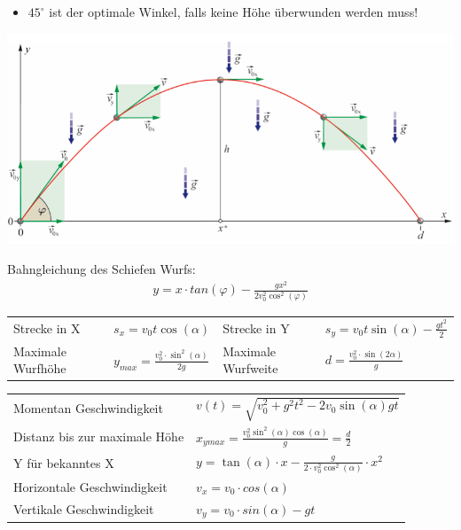 \documentclass[
a4paper,
oneside,
landscape, 
8pt,
]{scrartcl}
\begin{document}
\begin{multicols*}{2}
\begin{itemize}
	\item $45^\circ$ ist der optimale Winkel, falls keine Höhe überwunden werden muss!
\end{itemize}

\begin{minipage}[h!]{0.6\linewidth}
	\includegraphics[width=0.9\linewidth]{images/schiefer_wurf}
\end{minipage}
\hfill
\begin{minipage}[h!]{0.4\linewidth}
Bahngleichung des Schiefen Wurfs: 
\begin{align*}
y = x \cdot tan(\varphi) - \frac{g x^2}{2 v_0^2 \cos^2(\varphi)}
\end{align*}
\end{minipage}

\begin{tabbing}
	\begin{tabu} to \linewidth {X l X l}
		\toprule
		Strecke in X & $s_x = v_0 t \cos(\alpha)$ &
		Strecke in Y & $s_y = v_0 t \sin(\alpha)  - \frac{gt^2}{2}$ \\
		Maximale Wurfhöhe & $y_{max} = \frac{v_0^2 \cdot \sin^2(\alpha)}{2g}$ &
		Maximale Wurfweite & $d = \frac{v_0^2 \cdot \sin(2\alpha)}{g}$ \\
	\end{tabu}
\end{tabbing}

\begin{tabbing}
	\begin{tabu} to \linewidth {l X}
		Momentan Geschwindigkeit & $v(t) = \sqrt{v_0^2 + g^2 t^2 - 2 v_0 \sin(\alpha) gt}$ \\
		Distanz bis zur maximale Höhe & $x_{ymax} = \frac{v_0^2 \sin^2(\alpha) \cos(\alpha)}{g} = \frac{d}{2}$ \\
		Y für bekanntes X & $y = \tan(\alpha) \cdot x - \frac{g}{2 \cdot v_0^2 \cos^2(\alpha)} \cdot x^2 $ \\
		Horizontale Geschwindigkeit & $v_x = v_0 \cdot cos(\alpha)$ \\
		Vertikale Geschwindigkeit & $v_y = v_0 \cdot sin(\alpha) - g t$ \\
	\end{tabu}
\end{tabbing}


\end{multicols*}
\end{document}
